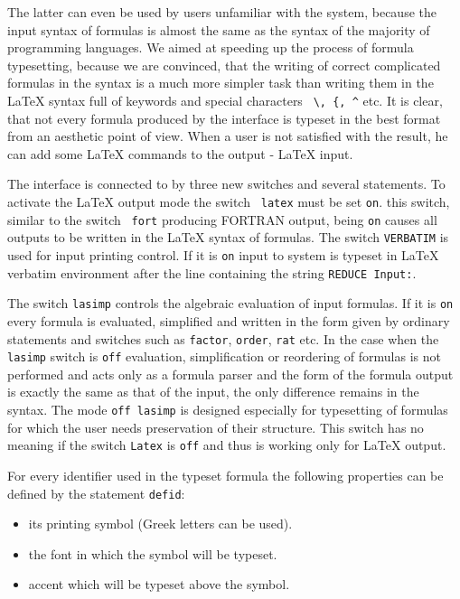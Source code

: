 The latter can even be used by users unfamiliar with the \REDUCE{}
system, because the \REDUCE{} input syntax of formulas is almost the
same as the syntax of the majority of programming languages.  We aimed
at speeding up the process of formula typesetting, because we are
convinced, that the writing of correct complicated formulas in the
\REDUCE{} syntax is a much more simpler task than writing them in the
\LaTeX{} syntax full of keywords and special characters \verb+ \, {, ^+
etc.  It is clear, that not every formula produced by the interface is
typeset in the best format from an aesthetic point of view.  When a user
is not satisfied with the result, he can add some \LaTeX{} commands to the
\REDUCE{} output - \LaTeX{} input.

The interface is connected to \REDUCE{} by three new switches and
several statements.  To activate the \LaTeX{} output mode the switch {\tt
latex} must be set {\tt on}.  this switch, similar to the switch {\tt
fort} producing FORTRAN output, being {\tt on} causes all outputs to be
written in the \LaTeX{} syntax of formulas.  The switch {\tt VERBATIM} is
used for input printing control.  If it is {\tt on} input to \REDUCE{} system
is typeset in \LaTeX{} verbatim environment after the line containing
the string {\tt REDUCE Input:}.

The switch {\tt lasimp} controls the algebraic evaluation of input
formulas.  If it is {\tt on} every formula is evaluated, simplified and
written in the form given by ordinary \REDUCE{} statements and switches
such as {\tt factor}, {\tt order}, {\tt rat} etc.  In the case when the
{\tt lasimp} switch is {\tt off} evaluation, simplification or
reordering of formulas is not performed and \REDUCE{} acts only as a
formula parser and the form of the formula output is exactly the same as
that of the input, the only difference remains in the syntax.  The mode
{\tt off lasimp} is designed especially for typesetting of formulas for
which the user needs preservation of their structure.  This switch has
no meaning if the switch {\tt Latex} is {\tt off} and thus is working
only for \LaTeX{} output.

For every  identifier  used  in  the  typeset  \REDUCE{}  formula
the following properties can be defined by the statement {\tt defid}:
\begin{itemize}
\item its printing symbol (Greek letters can be used).
\item the font in which the symbol will be typeset.
\item accent which will be typeset above the symbol.
\end{itemize}

